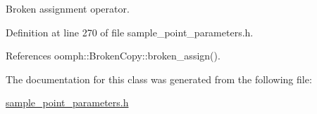Broken assignment operator. 



Definition at line 270 of file sample\+\_\+point\+\_\+parameters.\+h.



References oomph\+::\+Broken\+Copy\+::broken\+\_\+assign().



The documentation for this class was generated from the following file\+:\begin{DoxyCompactItemize}
\item 
\hyperlink{sample__point__parameters_8h}{sample\+\_\+point\+\_\+parameters.\+h}\end{DoxyCompactItemize}
